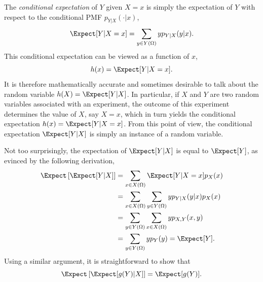 The \emph{conditional expectation} of $Y$ given $X = x$ is simply the expectation of $Y$ with respect to the conditional PMF $p_{Y|X} (\cdot | x)$, 
\begin{equation*}
\Expect [Y | X = x ] = \sum_{y \in Y(\Omega)} y p_{Y|X} (y|x).
\end{equation*}
This conditional expectation can be viewed as a function of $x$,
\begin{equation*}
h(x) = \Expect [Y | X = x] .
\end{equation*}
It is therefore mathematically accurate and sometimes desirable to talk about the random variable $h (X) = \Expect [Y | X]$.
In particular, if $X$ and $Y$ are two random variables associated with an experiment, the outcome of this experiment determines the value of $X$, say $X = x$, which in turn yields the conditional expectation $h(x) = \Expect [Y | X = x]$.
From this point of view, the conditional expectation $\Expect [Y | X]$ is simply an instance of a random variable.

Not too surprisingly, the expectation of $\Expect [Y | X]$ is equal to $\Expect [Y]$, as evinced by the following derivation,
\begin{equation*}
\begin{split}
\Expect \left[ \Expect [Y | X] \right]
&= \sum_{x \in X(\Omega)} \Expect [Y | X = x] p_X (x) \\
&= \sum_{x \in X(\Omega)} \sum_{y \in Y(\Omega)} y p_{Y|X} (y|x) p_X (x) \\
&= \sum_{y \in Y(\Omega)} \sum_{x \in X(\Omega)} y p_{X,Y} (x, y) \\
&= \sum_{y \in Y(\Omega)} y p_{Y} (y)
= \Expect [Y] .
\end{split}
\end{equation*}
Using a similar argument, it is straightforward to show that
\begin{equation*}
\Expect \left[ \Expect [g (Y) | X] \right] = \Expect [g(Y)] .
\end{equation*}

